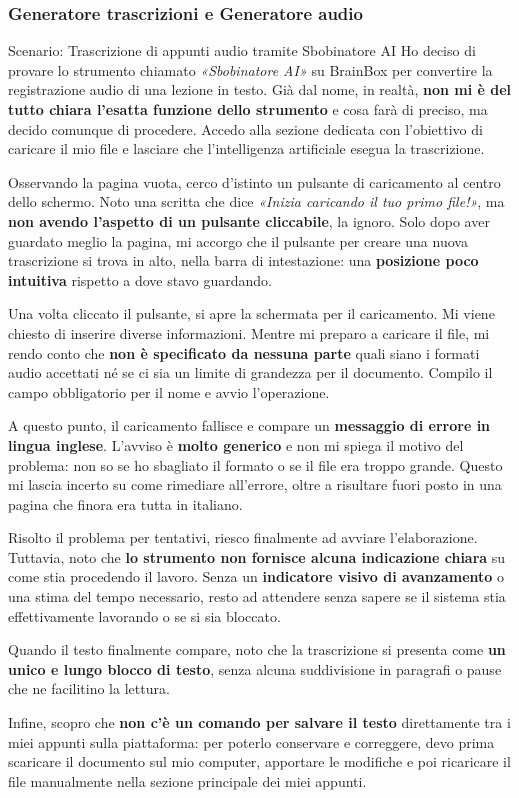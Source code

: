 \subsubsection*{Generatore trascrizioni e Generatore audio}

\begin{scenario}{Scenario: Trascrizione di appunti audio tramite Sbobinatore AI}
  Ho deciso di provare lo strumento chiamato \textit{«Sbobinatore AI»} su
  BrainBox per convertire la registrazione audio di una lezione in testo. Già dal nome, in realtà, \textbf{non mi è del tutto chiara l'esatta funzione dello strumento} e cosa farà di preciso, ma decido comunque di procedere. Accedo alla sezione dedicata con l'obiettivo di caricare il mio file e lasciare che l'intelligenza artificiale esegua la trascrizione.

  Osservando la pagina vuota, cerco d'istinto un pulsante di caricamento al centro dello schermo. Noto una scritta che dice \textit{«Inizia caricando il tuo primo file!»}, ma \textbf{non avendo l'aspetto di un pulsante cliccabile}, la ignoro. Solo dopo aver guardato meglio la pagina, mi accorgo che il pulsante per creare una nuova trascrizione si trova in alto, nella barra di intestazione: una \textbf{posizione poco
  intuitiva} rispetto a dove stavo guardando.

  Una volta cliccato il pulsante, si apre la schermata per il caricamento. Mi viene chiesto di inserire diverse informazioni.
  Mentre mi preparo a caricare il file, mi rendo conto che \textbf{non è specificato da nessuna parte} quali siano i formati audio accettati né se ci sia un limite di grandezza per il documento. Compilo il campo obbligatorio per il nome e avvio l'operazione.

  A questo punto, il caricamento fallisce e compare un \textbf{messaggio di errore in lingua inglese}. L'avviso è \textbf{molto generico} e non mi spiega il motivo del problema: non so se ho sbagliato il formato o se il file era troppo grande. Questo mi lascia incerto su come rimediare all'errore, oltre a risultare fuori posto in una pagina che finora era tutta in italiano.

  Risolto il problema per tentativi, riesco finalmente ad avviare l'elaborazione. Tuttavia, noto che \textbf{lo strumento non fornisce alcuna indicazione chiara} su come stia procedendo il lavoro. Senza un \textbf{indicatore visivo di avanzamento} o una stima del tempo necessario, resto ad attendere senza sapere se il sistema stia
  effettivamente lavorando o se si sia bloccato.

  Quando il testo finalmente compare, noto che la trascrizione si presenta come \textbf{un unico e lungo blocco di testo}, senza alcuna suddivisione in paragrafi o pause che ne facilitino la lettura.

  Infine, scopro che \textbf{non c'è un comando per salvare il testo} direttamente tra i miei appunti sulla piattaforma: per poterlo conservare e correggere, devo prima scaricare il documento sul mio
  computer, apportare le modifiche e poi ricaricare il file manualmente nella sezione principale dei miei appunti.
\end{scenario}

